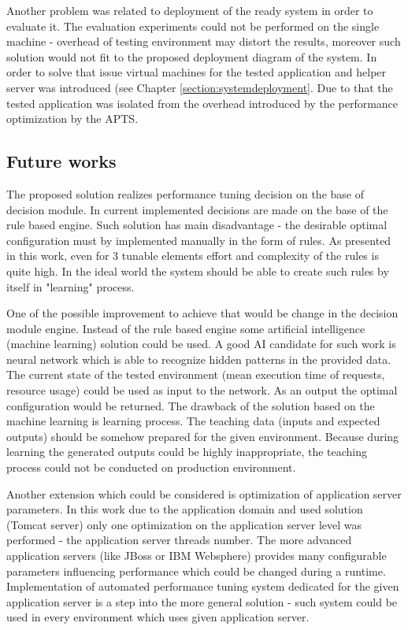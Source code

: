 \documentclass[12pt,a4paper]{article}
\begin{document}
Another problem was related to deployment of the ready system in order to evaluate it. The evaluation experiments could not be performed on the single machine - overhead of testing environment may distort the results, moreover such solution would not fit to the proposed deployment diagram of the system. In order to solve that issue virtual machines for the tested application and helper server was introduced (see Chapter \ref{section:systemdeployment}. Due to that the tested application was isolated from the overhead introduced by the performance optimization by the APTS. 

\subsection{Future works}

The proposed solution realizes performance tuning decision on the base of decision module. In current implemented decisions are made on the base of the rule based engine. Such solution has main disadvantage - the desirable optimal configuration must by implemented manually in the form of rules. As presented in this work, even for 3 tunable elements effort and complexity of the rules is quite high. In the ideal world the system should be able to create such rules by itself in "learning" process. 

One of the possible improvement to achieve that would be change in the decision module engine. Instead of the rule based engine some artificial intelligence (machine learning) solution could be used. A good AI candidate for such work is neural network which is able to recognize hidden patterns in the provided data. The current state of the tested environment (mean execution time of requests, resource usage) could be used as input to the network. As an output the optimal configuration would be returned. The drawback of the solution based on the machine learning is learning process. The teaching data (inputs and expected outputs) should be somehow prepared for the given environment. Because during learning the generated outputs could be highly inappropriate, the teaching process could not be conducted on production environment.

Another extension which could be considered is optimization of application server parameters. In this work due to the application domain and used solution (Tomcat server) only one optimization on the application server level was performed - the application server threads number. The more advanced application servers (like JBoss or IBM Websphere) provides many configurable parameters influencing performance which could be changed during a runtime. Implementation of automated performance tuning system dedicated for the given application server is a step into the more general solution - such system could be used in every environment which uses given application server.  
\end{document}
